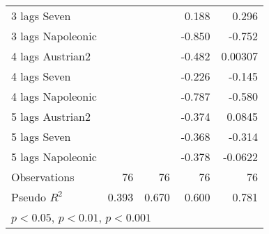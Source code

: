 \begin{table}[htbp]
\begin{tabular}{l*{4}{D{.}{.}{-1}}}
3 lags Seven        &                     &                     &       0.188         &       0.296\sym{***}\\
3 lags Napoleonic   &                     &                     &      -0.850\sym{***}&      -0.752\sym{***}\\
4 lags Austrian2    &                     &                     &      -0.482\sym{**} &     0.00307         \\
4 lags Seven        &                     &                     &      -0.226\sym{*}  &      -0.145\sym{*}  \\
4 lags Napoleonic   &                     &                     &      -0.787\sym{**} &      -0.580\sym{***}\\
5 lags Austrian2    &                     &                     &      -0.374\sym{*}  &      0.0845         \\
5 lags Seven        &                     &                     &      -0.368\sym{***}&      -0.314\sym{***}\\
5 lags Napoleonic   &                     &                     &      -0.378         &     -0.0622         \\
\midrule
Observations        &          76         &          76         &          76         &          76         \\
Pseudo \(R^{2}\)    &       0.393         &       0.670         &       0.600         &       0.781         \\
\bottomrule
{}\\
\end{tabular}
\end{table}
